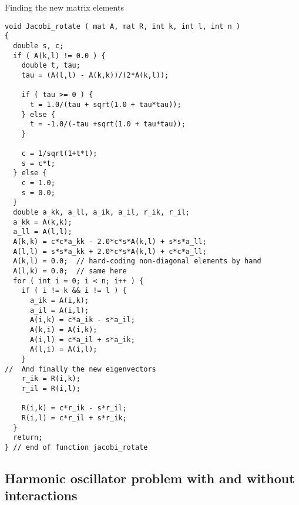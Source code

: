 \documentclass[%
oneside,                 %
final,                   %
10pt]{article}
\begin{document}
Finding the new matrix elements













































\begin{verbatim}
void Jacobi_rotate ( mat A, mat R, int k, int l, int n )
{
  double s, c;
  if ( A(k,l) != 0.0 ) {
    double t, tau;
    tau = (A(l,l) - A(k,k))/(2*A(k,l));
    
    if ( tau >= 0 ) {
      t = 1.0/(tau + sqrt(1.0 + tau*tau));
    } else {
      t = -1.0/(-tau +sqrt(1.0 + tau*tau));
    }
    
    c = 1/sqrt(1+t*t);
    s = c*t;
  } else {
    c = 1.0;
    s = 0.0;
  }
  double a_kk, a_ll, a_ik, a_il, r_ik, r_il;
  a_kk = A(k,k);
  a_ll = A(l,l);
  A(k,k) = c*c*a_kk - 2.0*c*s*A(k,l) + s*s*a_ll;
  A(l,l) = s*s*a_kk + 2.0*c*s*A(k,l) + c*c*a_ll;
  A(k,l) = 0.0;  // hard-coding non-diagonal elements by hand
  A(l,k) = 0.0;  // same here
  for ( int i = 0; i < n; i++ ) {
    if ( i != k && i != l ) {
      a_ik = A(i,k);
      a_il = A(i,l);
      A(i,k) = c*a_ik - s*a_il;
      A(k,i) = A(i,k);
      A(i,l) = c*a_il + s*a_ik;
      A(l,i) = A(i,l);
    }
//  And finally the new eigenvectors
    r_ik = R(i,k);
    r_il = R(i,l);

    R(i,k) = c*r_ik - s*r_il;
    R(i,l) = c*r_il + s*r_ik;
  }
  return;
} // end of function jacobi_rotate

\end{verbatim}


\subsection*{Harmonic oscillator problem with and without interactions}
\end{document}
